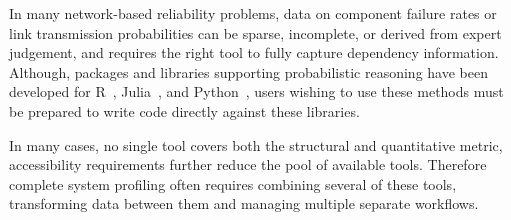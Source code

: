 \documentclass[conference]{IEEEtran}
\begin{document}
In many network-based reliability problems, data on component failure rates or link transmission probabilities can be sparse, incomplete, or derived from expert judgement, and requires the right tool to fully capture dependency information. Although, packages and libraries supporting probabilistic reasoning have been developed for R~\cite{ferson2019pbar}, Julia~\cite{gray2022pba_julia}, and Python~\cite{gray2022pba}, users wishing to use these methods must be prepared to write code directly against these libraries. 



In many cases, no single tool covers both the structural and quantitative metric, accessibility requirements further reduce the pool of available tools. Therefore complete system profiling often requires combining several of these tools, transforming data between them and managing multiple separate workflows. 
\end{document}
